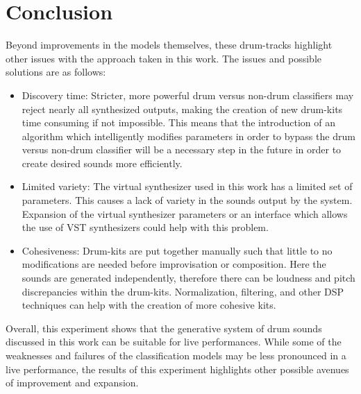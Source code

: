 \documentclass[\main/thesis.tex]{subfiles}
\begin{document}
\section{Conclusion}
 Beyond improvements in the models themselves, these drum-tracks highlight other issues with the approach taken in this work. The issues and possible solutions are as follows:
~\begin{itemize}
    \item  Discovery time: Stricter,  more  powerful  drum  versus  non-drum  classifiers may reject nearly all synthesized outputs, making the creation of new drum-kits time consuming if not impossible. This means that the introduction of an algorithm which intelligently  modifies  parameters  in  order  to  bypass  the  drum  versus  non-drum classifier will be a necessary step in the future in order to create desired sounds more efficiently.
    
    \item Limited variety: The virtual synthesizer used in this work has a limited set of parameters. This causes a lack of variety in the sounds output by the system. Expansion of the virtual synthesizer parameters or an interface which allows the use of VST synthesizers could help with this problem.
    
    \item Cohesiveness: Drum-kits are put together manually such that little to no modifications are needed before improvisation or composition. Here the sounds are generated independently, therefore there can be loudness and pitch discrepancies within the drum-kits. Normalization, filtering, and other DSP techniques can help with the creation of more cohesive kits. 
\end{itemize}
Overall, this experiment shows that the generative system of drum sounds discussed in this work can be suitable for live performances. While some of the weaknesses and failures of the classification models may be less pronounced in a live performance, the results of this experiment highlights other possible avenues of improvement and expansion. 
\end{document}

